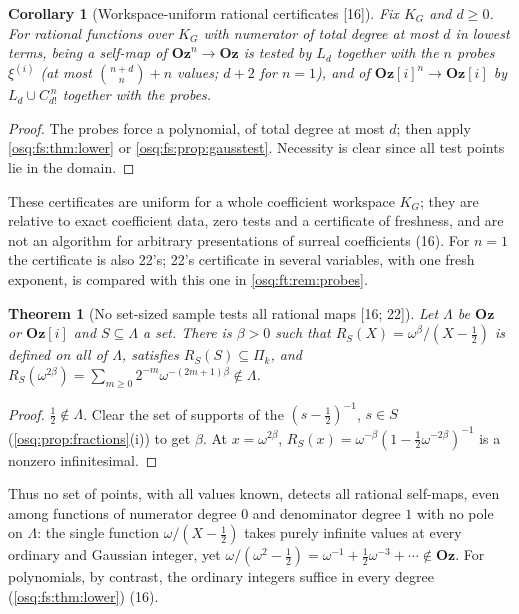 \documentclass[11pt,letterpaper]{article}
\numberwithin{equation}{section}
\newtheorem{theorem}{Theorem}[section]
\newtheorem{corollary}[corollary]{Corollary}
\theoremstyle{definition}
\theoremstyle{remark}
\theoremstyle{plain}
\newcommand{\Oz}{\mathbf{Oz}}
\newcommand{\GOz}{\Oz[i]}
\newcommand{\src}[1]{\textup{\textsf{[#1]}}}
\begin{document}
\begin{corollary}[Workspace-uniform rational certificates \src{16}]\label{osq:fs:cor:certificates}
Fix $K_G$ and $d\ge0$. For rational functions over $K_G$ with numerator of total degree at most $d$ in lowest terms, being a self-map of
$\Oz^n\to\Oz$ is tested by $L_d$ together with the $n$ probes $\xi^{(i)}$ (at most $\binom{n+d}n+n$ values; $d+2$ for $n=1$), and of
$\GOz^n\to\GOz$ by $L_d\cup C_{d!}^{\,n}$ together with the probes.
\end{corollary}
\begin{proof}
The probes force a polynomial, of total degree at most $d$; then apply \cref{osq:fs:thm:lower} or \cref{osq:fs:prop:gausstest}. Necessity is
clear since all test points lie in the domain.
\end{proof}

These certificates are uniform for a whole coefficient workspace $K_G$; they are relative to exact coefficient data, zero tests and a certificate
of freshness, and are not an algorithm for arbitrary presentations of surreal coefficients (16). For $n=1$ the certificate is also 22's; 22's
certificate in several variables, with one fresh exponent, is compared with this one in \cref{osq:ft:rem:probes}.

\begin{theorem}[No set-sized sample tests all rational maps \src{16; 22}]\label{osq:fs:thm:nosmall}
Let $\Lambda$ be $\Oz$ or $\GOz$ and $S\subseteq\Lambda$ a set. There is $\beta>0$ such that $R_S(X)=\omega^\beta/(X-\frac12)$ is defined on all of
$\Lambda$, satisfies $R_S(S)\subseteq\Pi_k$, and $R_S(\omega^{2\beta})=\sum_{m\ge0}2^{-m}\omega^{-(2m+1)\beta}\notin\Lambda$.
\end{theorem}
\begin{proof}
$\tfrac12\notin\Lambda$. Clear the set of supports of the $(s-\tfrac12)^{-1}$, $s\in S$ (\cref{osq:prop:fractions}(i)) to get $\beta$. At
$x=\omega^{2\beta}$, $R_S(x)=\omega^{-\beta}(1-\tfrac12\omega^{-2\beta})^{-1}$ is a nonzero infinitesimal.
\end{proof}

Thus no set of points, with all values known, detects all rational self-maps, even among functions of numerator degree $0$ and denominator
degree $1$ with no pole on $\Lambda$: the single function $\omega/(X-\frac12)$ takes purely infinite values at every ordinary and Gaussian
integer, yet $\omega/(\omega^2-\frac12)=\omega^{-1}+\frac12\omega^{-3}+\cdots\notin\Oz$. For polynomials, by contrast, the ordinary integers
suffice in every degree (\cref{osq:fs:thm:lower}) (16).
\end{document}
